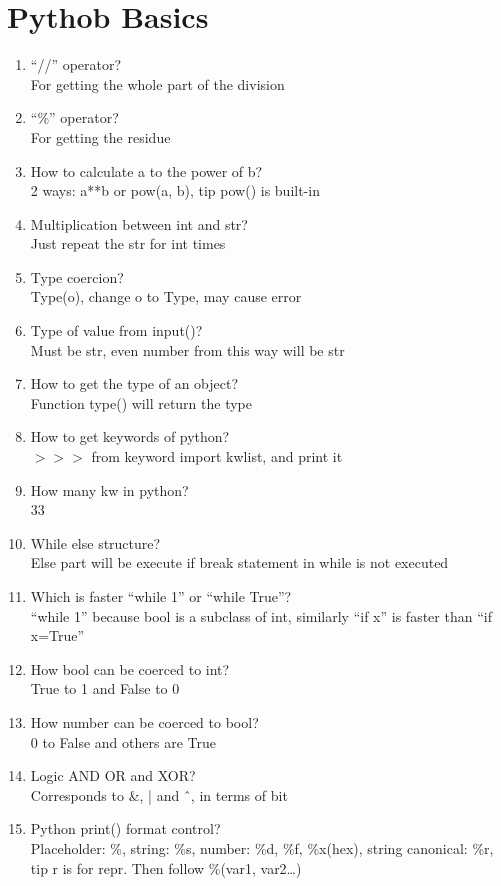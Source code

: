 \documentclass[10pt,a4paper,oneside]{article}
\begin{document}
\section{Pythob Basics}
\begin{enumerate}[1.]
\item``//''  operator?\\
For getting the whole part of the division
\item ``\%'' operator?\\
For getting the residue
\item How to calculate a to the power of b?\\
2 ways: a**b or pow(a, b), tip pow() is built-in
\item Multiplication between int and str?\\
Just repeat the str for int times
\item Type coercion?\\
Type(o), change o to Type, may cause error
\item Type of value from input()?\\
Must be str, even number from this way will be str
\item How to get the type of an object?\\
Function type() will return the type
\item How to get keywords of python?\\
$>>>$ from keyword import kwlist, and print it
\item How many kw in python?\\
33
\item While else structure?\\
Else part will be execute if break statement in while is not executed
\item Which is faster “while 1” or “while True”?\\
“while 1” because bool is a subclass of int, similarly “if x” is faster than “if x=True”
\item How bool can be coerced to int?\\
True to 1 and False to 0
\item How number can be coerced to bool?\\
0 to False and others are True
\item Logic AND OR and XOR?\\
Corresponds to \&, | and \^\ , in terms of bit
\item Python print() format control?\\
Placeholder: \%, string: \%s, number: \%d, \%f, \%x(hex), string canonical: \%r, tip r is for repr. Then follow \%(var1, var2…)

\end{enumerate}
\end{document}
